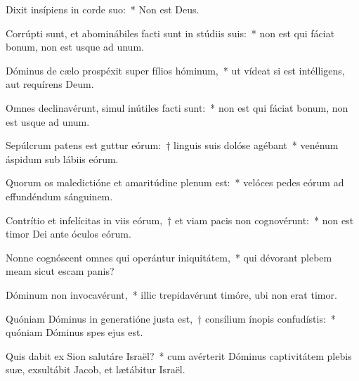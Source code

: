 \item Dixit insípiens in corde suo:~* Non est Deus.

\item Corrúpti sunt, et abominábiles facti sunt in stúdiis suis:~* non est qui fáciat bonum, non est usque ad unum.

\item Dóminus de cælo prospéxit super fílios hóminum,~* ut vídeat si est intélligens, aut requírens Deum.

\item Omnes declinavérunt, simul inútiles facti sunt:~* non est qui fáciat bonum, non est usque ad unum.

\item Sepúlcrum patens est guttur eórum:~† linguis suis dolóse agébant~* venénum áspidum sub lábiis eórum.

\item Quorum os maledictióne et amaritúdine plenum est:~* velóces pedes eórum ad effundéndum sánguinem.

\item Contrítio et infelícitas in viis eórum,~† et viam pacis non cognovérunt:~* non est timor Dei ante óculos eórum.

\item Nonne cognóscent omnes qui operántur iniquitátem,~* qui dévorant plebem meam sicut escam panis?

\item Dóminum non invocavérunt,~* illic trepidavérunt timóre, ubi non erat timor.

\item Quóniam Dóminus in generatióne justa est,~† consílium ínopis confudístis:~* quóniam Dóminus spes ejus est.

\item Quis dabit ex Sion salutáre Israël?~* cum avérterit Dóminus captivitátem plebis suæ, exsultábit Jacob, et lætábitur Israël.

